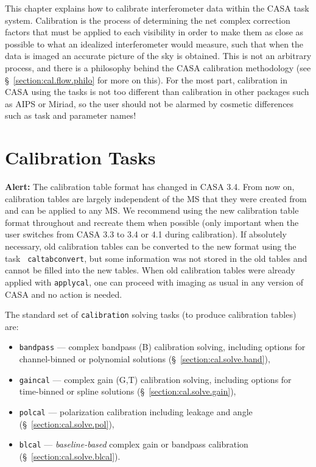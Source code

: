 This chapter explains how to calibrate interferometer
data within the CASA task system.  Calibration is the process
of determining the net complex correction factors that must be 
applied to each visibility in order to make them as close as
possible to what an idealized interferometer would measure, such
that when the data is imaged an accurate picture of the sky
is obtained.  This is not an arbitrary process, and there is
a philosophy behind the CASA calibration methodology (see
\S~\ref{section:cal.flow.philo} for more on this).  For the most part,
calibration in CASA using the tasks is not too different than
calibration in other packages such as AIPS or Miriad, so the user
should not be alarmed by cosmetic differences such as task and
parameter names!

\section{Calibration Tasks}
\label{section:cal.tasks}

{\bf Alert:} The calibration table format has changed in CASA
3.4. From now on, calibration tables are largely independent of the MS that
they were created from and can be applied to any MS. We recommend
using the new calibration table format throughout and recreate them
when possible (only important when the user switches from CASA 3.3
to 3.4 or 4.1 during calibration). If absolutely necessary, old calibration
tables can be converted to the new format using the task {\tt
  caltabconvert}, but some information was not stored in the old
tables and cannot be filled into the new tables. When old calibration
tables were already applied with {\tt applycal}, one can proceed with
imaging as usual in any version of CASA and no action is needed.




The standard set of {\tt calibration} solving tasks (to produce
calibration tables) are:
\begin{itemize}
   \item {\tt bandpass} --- complex bandpass (B) calibration solving,
      including options for channel-binned or polynomial solutions
      (\S~\ref{section:cal.solve.band}),
   \item {\tt gaincal} --- complex gain (G,T) calibration solving, 
      including options for time-binned or spline solutions
      (\S~\ref{section:cal.solve.gain}),
   \item {\tt polcal} --- polarization calibration including leakage
      and angle
      (\S~\ref{section:cal.solve.pol}),
   \item {\tt blcal} --- {\it baseline-based} complex gain or bandpass
      calibration
      (\S~\ref{section:cal.solve.blcal}).
\end{itemize}

